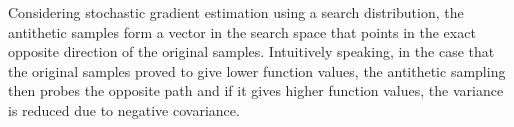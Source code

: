 Considering stochastic gradient estimation using a search distribution, the antithetic samples form a vector in the search space that points in the exact opposite direction of the original samples. Intuitively speaking, in the case that the original samples proved to give lower function values, the antithetic sampling then probes the opposite path and if it gives higher function values, the variance is reduced due to negative covariance. 



